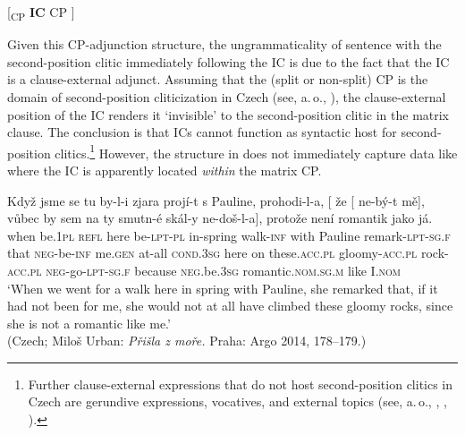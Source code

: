 \documentclass[output=paper,colorlinks,citecolor=brown,
modfonts,newtxmath
]{langscibook}
\begin{document}
\ea\label{tree:CPadjunction}
{[\textsubscript{CP} \textbf{IC} CP ]}
\z

\noindent Given this CP-adjunction structure, the ungrammaticality of sentence  with the second-position clitic immediately following the IC is due to the fact that the IC is a clause-external adjunct. Assuming that the (split or non-split) CP is the domain of second-position cliticization in Czech (see, a.\,o., \citealt{Junghanns2002,Lenertova2004}), the clause-external position of the IC renders it `invisible' to the second-position clitic in the matrix clause. The conclusion is that ICs cannot function as syntactic host for second-position clitics.\footnote{Further clause-external expressions that do not host second-position clitics in Czech are gerundive expressions, vocatives, and external topics (see, a.\,o., \citealt{Dokulil1956}, \citealt{Travnicek1959}, \citealt[130--131]{Junghanns2002}).}
However, the structure in  does not immediately capture data like  where the IC is apparently located \textit{within} the matrix CP.

\ea\label{ex:Pauline}
\gll Když jsme se tu by-l-i zjara projí-t s Pauline, prohodi-l-a, [\hspace{-2pt} že [\hspace{-2pt} ne-bý-t mě], vůbec by sem na ty smutn-é skál-y ne-doš-l-a], protože není romantik jako já.\\
	when be.\textsc{1pl} \textsc{refl} here be-\textsc{lpt-pl} {in-spring} walk-\textsc{inf} with Pauline remark-\textsc{lpt-sg.f} {} that {} \textsc{neg}-be-\textsc{inf} me.\textsc{gen} {at-all} \textsc{cond.3sg} here on these.\textsc{acc.pl} gloomy-\textsc{acc.pl} rock-\textsc{acc.pl} \textsc{neg}-go-\textsc{lpt-sg.f} because \textsc{neg}.be.\textsc{3sg} romantic.\textsc{nom.sg.m} like I.\textsc{nom}\\ 
\glt `When we went for a walk here in spring with Pauline, she remarked that, if it had not been for me, she would not at all have climbed these gloomy rocks, since she is not a romantic like me.' \\ \hfill (Czech; Miloš Urban: \textit{Přišla z moře.} Praha: Argo 2014, 178--179.)
\z
\end{document}
